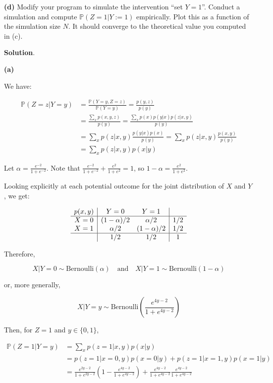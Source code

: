 \textbf{(d)} Modify your program to simulate the intervention ``set
\(Y = 1\)''. Conduct a simulation and compute
\(\mathbb{P}(Z = 1 | Y := 1)\) empirically. Plot this as a function of
the simulation size \(N\). It should converge to the theoretical value
you computed in (c).

\textbf{Solution}.

\textbf{(a)}

We have:

\[
\begin{align}
\mathbb{P}(Z = z | Y = y) &= \frac{\mathbb{P}(Y = y, Z = z)}{\mathbb{P}(Y = y)} = \frac{p(y, z)}{p(y)} \\
&= \frac{\sum_x p(x, y, z)}{p(y)} = \frac{\sum_x p(x) p(y | x) p(z | x, y)}{p(y)} \\
&= \sum_x p(z | x, y) \frac{p(y | x) p(x)}{p(y)} = \sum_x p(z | x, y) \frac{p(x, y)}{p(y)} \\
&= \sum_x p(z | x, y) p(x | y)
\end{align}
\]

Let \(\alpha = \frac{e^{-2}}{1 + e^{-2}}\). Note that
\(\frac{e^{-2}}{1 + e^{-2}} + \frac{e^{2}}{1 + e^{2}} = 1\), so
\(1 - \alpha = \frac{e^{2}}{1 + e^{2}}\).

Looking explicitly at each potential outcome for the joint distribution
of \(X\) and \(Y\), we get:

\[
\begin{array}{c | cc | c}
p(x, y) & Y = 0 & Y = 1 & \\
\hline
X = 0 & (1 - \alpha) / 2 & \alpha / 2 & 1/2 \\
X = 1 & \alpha / 2 & (1 - \alpha) / 2 & 1/2 \\
\hline
  & 1/2 & 1/2 & 1
\end{array}
\]

Therefore,

\[ X | Y = 0 \sim \text{Bernoulli}\left( \alpha \right) 
\quad \text{and} \quad
X | Y = 1 \sim \text{Bernoulli}\left( 1 - \alpha \right) 
\]

or, more generally,

\[
X | Y = y \sim \text{Bernoulli}\left( \frac{e^{4y - 2}}{1 + e^{4y - 2}} \right) 
\]

Then, for \(Z = 1\) and \(y \in \{ 0, 1 \}\),

\[
\begin{align}
\mathbb{P}(Z = 1 | Y = y) &= \sum_x p(z = 1 | x, y) p(x | y) \\
&= p(z = 1 | x = 0, y) p(x = 0 | y) + p(z = 1 | x = 1, y) p(x = 1 | y) \\
&= \frac{e^{2y - 2}}{1 + e^{2y - 2}} \left( 1 - \frac{e^{4y - 2}}{1 + e^{4y - 2}} \right) + \frac{e^{4y - 2}}{1 + e^{4y - 2}} \frac{e^{4y - 2}}{1 + e^{4y - 2}}
\end{align}
\]

